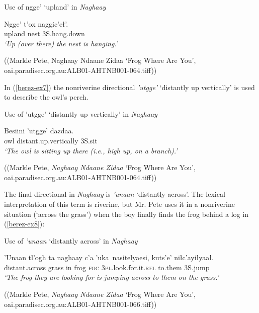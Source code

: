 \clearpage
\begin{exe}
\ex Use of ngge’ ‘upland’ in \textit{Naghaay}\label{berez-ex6}
\begin{xlistn}
\gll Ngge’	t’ox 	naggic’eł’.\\
		upland	nest		3S.hang.down \\
\glt		\textit{‘Up (over there) the nest is hanging.’}
\end{xlistn}
\begin{flushright}
((Markle Pete, Naghaay Ndaane Zidaa ‘Frog Where Are You’,\\
oai.paradisec.org.au:ALB01-AHTNB001-064.tiff))
\end{flushright}
\end{exe}


\noindent
In (\ref{berez-ex7}) the nonriverine directional \textit{’utgge’} ‘distantly up vertically’ is used to describe the owl’s perch.


\begin{exe}
\ex Use of ’utgge’ ‘distantly up vertically’ in \textit{Naghaay}\label{berez-ex7}
\begin{xlistn}
	\gll	Besiini 	’utgge’				dazdaa.\\
		owl			distant.up.vertically	3S.sit\\
	\glt \textit{`The owl is sitting up there (i.e., high up, on a branch).’}
\end{xlistn}

\begin{flushright}
((Markle Pete, \textit{Naghaay Ndaane Zidaa} ‘Frog Where Are You’,\\
oai.paradisec.org.au:ALB01-AHTNB001-064.tiff))
\end{flushright}
\end{exe}

\noindent
The final directional in \textit{Naghaay} is \textit{’unaan} ‘distantly across’. The lexical interpretation of this term is riverine, but Mr. Pete uses it in a nonriverine situation (‘across the grass’) when the boy finally finds the frog behind a log in (\ref{berez-ex8}):

\begin{exe}
\ex Use of \textit{’unaan} ‘distantly across’ in \textit{Naghaay}\label{berez-ex8}
\begin{xlistn}
 \gll ’Unaan	tl’ogh	ta 		naghaay	c’a		’uka~nasitelyaesi, 	kuts’e’		niłc’ayiłyaał. \\
		distant.across	grass	in		frog			\textsc{foc} 	3\textsc{pl}.look.for.it.\textsc{rel}	to.them		3S.jump \\


\glt \textit{‘The frog they are looking for is jumping across to them on the grass.’}
\end{xlistn}
\begin{flushright}
((Markle Pete, \textit{Naghaay Ndaane Zidaa} ‘Frog Where Are You’,\\
oai.paradisec.org.au:ALB01-AHTNB001-066.tiff))
\end{flushright}
\end{exe}

